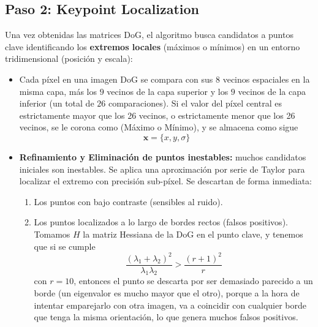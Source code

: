 \subsection{Paso 2: Keypoint Localization}
\noindent
Una vez obtenidas las matrices DoG, el algoritmo busca candidatos a puntos clave identificando los \textbf{extremos locales} (máximos o mínimos) en un entorno tridimensional (posición y escala):
\begin{itemize}
    \item Cada píxel en una imagen DoG se compara con sus $8$ vecinos espaciales en la misma capa, más los $9$ vecinos de la capa superior y los $9$ vecinos de la capa inferior (un total de $26$ comparaciones). Si el valor del píxel central es estrictamente mayor que los 26 vecinos, o estrictamente menor que los 26 vecinos, se le corona como  (Máximo o Mínimo), y se almacena como sigue
    \begin{equation*}
        \mathbf{x}=\{x,y,\sigma\}
    \end{equation*}
    \item \textbf{Refinamiento y Eliminación de puntos inestables:} muchos candidatos iniciales son inestables. Se aplica una aproximación por serie de Taylor para localizar el extremo con precisión sub-píxel. Se descartan de forma inmediata:
    \begin{enumerate}
        \item Los puntos con bajo contraste (sensibles al ruido).
        \item Los puntos localizados a lo largo de bordes rectos (falsos positivos). Tomamos $H$ la matriz Hessiana de la DoG en el punto clave, y tenemos que si se cumple
        \begin{equation*}
            \dfrac{(\lambda_1 + \lambda_2)^2}{\lambda_1 \lambda_2} > \dfrac{(r+1)^2}{r}
        \end{equation*}
        con $r=10$, entonces el punto se descarta por ser demasiado parecido a un borde (un eigenvalor es mucho mayor que el otro), porque a la hora de intentar emparejarlo con otra imagen, va a coincidir con cualquier borde que tenga la misma orientación, lo que genera muchos falsos positivos.
        
    \end{enumerate}
\end{itemize}

